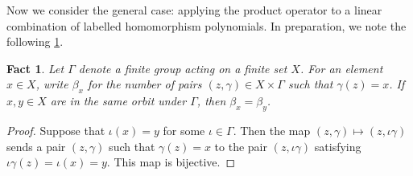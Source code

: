 \documentclass[11pt, DIV=15]{scrarticle}
\theoremstyle{definition}
\newtheorem{example}[definition]{Example}
\theoremstyle{plain}
\newtheorem{fact}[definition]{Fact}
\theoremstyle{remark}
\begin{document}
%

	Now we consider the general case: applying the product operator to a linear combination of labelled homomorphism polynomials.
	In preparation, we note the following \cref{fact:orbits}.

	\begin{fact}\label{fact:orbits}
		Let $\Gamma$ denote a finite group acting on a finite set $X$.
		For an element $x \in X$, write $\beta_x$ for the number of pairs $(z, \gamma) \in X \times \Gamma$ such that $\gamma(z) = x$.
		If $x, y \in X$ are in the same orbit under $\Gamma$,
		then $\beta_x = \beta_y$.
	\end{fact}
	\begin{proof}
		Suppose that $\iota(x) = y$ for some $\iota \in \Gamma$.
		Then the map $(z, \gamma) \mapsto (z, \iota \gamma )$ sends a pair $(z, \gamma)$ such that $\gamma(z) = x$ to the pair $(z, \iota \gamma)$ satisfying $\iota \gamma (z) = \iota(x) = y$.
		This map is bijective.
	\end{proof}
\end{document}
